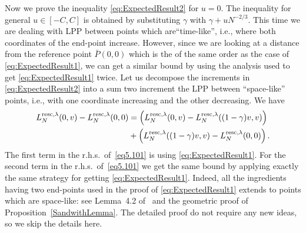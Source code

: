 \documentclass[12pt,a4paper]{article}
\numberwithin{equation}{section}
\begin{document}
Now we prove the inequality \eqref{eq:ExpectedResult2} for $u=0$. The inequality for general $u\in[-C,C]$ is obtained by substituting $\gamma$ with $\gamma+uN^{-2/3}$.
This time we are dealing with LPP between points which are``time-like'', i.e., where both coordinates of the end-point increase. However, since we are looking at a distance from the reference point $\bar P(0,0)$ which is the of the same order as the case of \eqref{eq:ExpectedResult1}, we can get a similar bound by using the analysis used to get \eqref{eq:ExpectedResult1} twice. Let us decompose the increments in \eqref{eq:ExpectedResult2} into a sum two increment the LPP between ``space-like'' points, i.e., with one coordinate increasing and the other decreasing. We have
\begin{equation}\label{eq5.101}
\begin{aligned}
L^{{\rm resc},\lambda}_N(0,v)-L^{{\rm resc},\lambda}_N(0,0) &= \left(L^{{\rm resc},\lambda}_N(0,v)-L^{{\rm resc},\lambda}_N((1-\gamma)v,v)\right) \\
&+ \left(L^{{\rm resc},\lambda}_N((1-\gamma)v,v)-L^{{\rm resc},\lambda}_N(0,0)\right).
\end{aligned}
\end{equation}
The first term in the r.h.s.~of~\eqref{eq5.101} is using \eqref{eq:ExpectedResult1}. For the second term in the r.h.s.~of~\eqref{eq5.101} we get the same bound by applying exactly the same strategy for getting \eqref{eq:ExpectedResult1}. Indeed, all the ingredients having two end-points used in the proof of \eqref{eq:ExpectedResult1} extends to points which are space-like: see Lemma~4.2 of~\cite{BCS06} and the geometric proof of Proposition~\ref{SandwithLemma}. The detailed proof do not require any new ideas, so we skip the details here.
\end{document}

